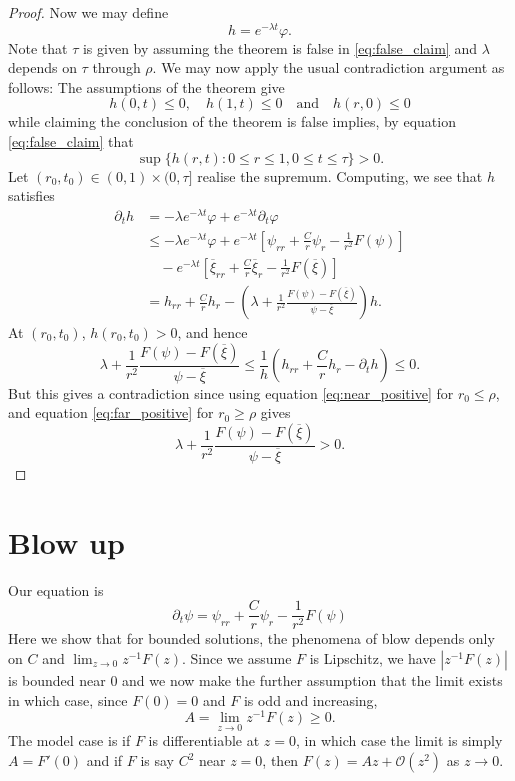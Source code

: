 \documentclass{amsart}
\begin{document}
\begin{proof}
Now we may define
\[
h = e^{-\lambda t} \varphi.
\]
Note that \(\tau\) is given by assuming the theorem is false in \eqref{eq:false_claim} and \(\lambda\) depends on \(\tau\) through \(\rho\). We may now apply the usual contradiction argument as follows: The assumptions of the theorem give
\[
h(0, t) \leq 0, \quad h(1, t) \leq 0 \quad \text{and} \quad h(r, 0) \leq 0
\]
while claiming the conclusion of the theorem is false implies, by equation \eqref{eq:false_claim} that
\[
\sup \{h(r, t) : 0 \leq r \leq 1, 0 \leq t \leq \tau\} > 0.
\]
Let \((r_0, t_0) \in (0, 1) \times (0, \tau]\) realise the supremum. Computing, we see that \(h\) satisfies
\[
\begin{split}
\partial_t h &= - \lambda e^{-\lambda t} \varphi + e^{-\lambda t} \partial_t \varphi \\
&\leq  -\lambda e^{-\lambda t} \varphi + e^{-\lambda t} \left[\psi_{rr} + \frac{C}{r} \psi_r - \frac{1}{r^2} F(\psi)\right] \\
&\quad - e^{-\lambda t}\left[\overline{\xi}_{rr} + \frac{C}{r} \overline{\xi}_r - \frac{1}{r^2} F(\overline{\xi})\right] \\
&= h_{rr} + \frac{C}{r} h_r - \left(\lambda + \frac{1}{r^2} \frac{F(\psi) - F(\overline{\xi})}{\psi - \overline{\xi}}\right) h.
\end{split}
\]
At \((r_0, t_0)\), \(h(r_0, t_0) > 0\), and hence
\[
\lambda + \frac{1}{r^2} \frac{F(\psi) - F(\overline{\xi})}{\psi - \overline{\xi}} \leq \frac{1}{h} \left(h_{rr} + \frac{C}{r} h_r - \partial_t h\right) \leq 0.
\]
But this gives a contradiction since using equation \eqref{eq:near_positive} for \(r_0 \leq \rho\), and equation \eqref{eq:far_positive} for \(r_0 \geq \rho\) gives
\[
\lambda + \frac{1}{r^2} \frac{F(\psi) - F(\overline{\xi})}{\psi - \overline{\xi}} > 0.
\]
\end{proof}

\section{Blow up}

Our equation is
\[
\partial_t \psi = \psi_{rr} + \frac{C}{r} \psi_r - \frac{1}{r^2} F(\psi)
\]
Here we show that for bounded solutions, the phenomena of blow depends only on \(C\) and \(\lim_{z\to 0} z^{-1} F(z)\). Since we assume \(F\) is Lipschitz, we have \(|z^{-1} F(z)|\) is bounded near \(0\) and we now make the further assumption that the limit exists in which case, since \(F(0) = 0\) and \(F\) is odd and increasing,
\[
A = \lim_{z\to 0} z^{-1} F(z) \geq 0.
\]
The model case is if \(F\) is differentiable at \(z=0\), in which case the limit is simply \(A = F'(0)\) and if \(F\) is say \(C^2\) near \(z=0\), then \(F(z) = Az + \mathcal{O} (z^2)\) as \(z \to 0\).
\end{document}
